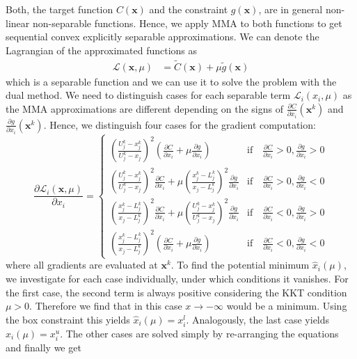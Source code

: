Both, the target function $C(\mathbf{x})$ and the constraint $g(\mathbf{x})$, are in general non-linear non-separable functions. Hence, we apply MMA to both functions to get sequential convex explicitly separable approximations.
We can denote the Lagrangian of the approximated functions as 
\begin{align}
    \mathcal{L}(\mathbf{x}, \mu) &= \tilde{C}(\mathbf{x}) + \mu \tilde{g}(\mathbf{x})
\end{align}
which is a separable function and we can use it to solve the problem with the dual method. We need to distinguish cases for each separable term $\mathcal{L}_i(x_i, \mu)$ as the MMA approximations are different depending on the signs of $\frac{\partial C}{\partial x_i} (\mathbf{x}^k)$ and $\frac{\partial g}{\partial x_i} (\mathbf{x}^k)$. Hence, we distinguish four cases for the gradient computation:
\begin{equation}
    \frac{\partial \mathcal{L}_i (\mathbf{x}, \mu)}{\partial x_i} = 
    \begin{cases}
        \left(\frac{U_j^k-x_j^k}{U_j^k-x_j}\right)^2 \left(\frac{\partial C}{\partial x_i} + \mu \frac{\partial g}{\partial x_i} \right) 
            &\textrm{if} \quad \frac{\partial C}{\partial x_i} > 0, \frac{\partial g}{\partial x_i} > 0 \\
        \left(\frac{U_j^k-x_j^k}{U_j^k-x_j}\right)^2 \frac{\partial C}{\partial x_i}  + \mu \left(\frac{x_j^k-L_j^k}{x_j-L_j^k}\right)^2 \frac{\partial g}{\partial x_i} 
            &\textrm{if} \quad \frac{\partial C}{\partial x_i}  > 0, \frac{\partial g}{\partial x_i} <0\\
        \left(\frac{x_j^k-L_j^k}{x_j-L_j^k}\right)^2 \frac{\partial C}{\partial x_i}  + \mu \left(\frac{U_j^k-x_j^k}{U_j^k-x_j}\right)^2\frac{\partial g}{\partial x_i} 
            &\textrm{if} \quad \frac{\partial C}{\partial x_i} < 0, \frac{\partial g}{\partial x_i}  > 0\\
        \left(\frac{x_j^k-L_j^k}{x_j-L_j^k}\right)^2 \left(\frac{\partial C}{\partial x_i}  + \mu \frac{\partial g}{\partial x_i} \right) 
            &\textrm{if} \quad \frac{\partial C}{\partial x_i}< 0, \frac{\partial g}{\partial x_i}< 0
    \end{cases}
\end{equation}
where all gradients are evaluated at $\mathbf{x}^k$.
To find the potential minimum $\hat{x}_i(\mu)$, we investigate for each case individually, under which conditions it vanishes. For the first case, the second term is always positive considering the KKT condition $\mu>0$. Therefore we find that in this case $x\rightarrow -\infty$ would be a minimum. Using the box constraint this yields $\hat{x}_i(\mu) = x^l_i$. Analogously, the last case yields $\hat{x}_i(\mu) = x^u_i$. The other cases are solved simply by re-arranging the equations and finally we get 
